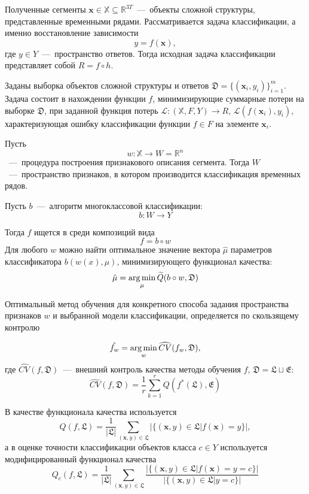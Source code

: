 \documentclass[12pt, twoside]{article}
\begin{document}
Полученные сегменты $\mathbf{x} \in \mathbb{X}\subseteq \mathds{R}^{3T}$~---~объекты сложной структуры, представленные временными рядами. Рассматривается задача классификации, а именно восстановление зависимости $$y=f(\mathbf{x}),$$ где $y\in Y$~---~пространство ответов. Тогда исходная задача классификации представляет собой $R=f\circ h$.

Заданы выборка объектов сложной структуры и ответов $\mathfrak{D}=\{(\mathbf{x}_i,y_i)\}_{i=1}^m$. Задача состоит в нахождении функции $f$, минимизирующие суммарные потери на выборке $\mathfrak{D}$, при заданной функция потерь $\mathscr{L}:(\mathbb{X},F,Y)\rightarrow R$, $\mathscr{L}(f(\mathbf{x}_i),y_i)$, характеризующая ошибку классификации функции $f\in F$ на элементе $\mathbf{x}_i$. 

Пусть $$w:\mathbb{X}\rightarrow W = \mathds{R}^n$$~---~процедура построения признакового описания сегмента. Тогда $W$~---~пространство признаков, в котором производится классификация временных рядов.

Пусть $b$~---~алгоритм многоклассовой классификации: 
\begin{equation}\label{classif}
b:W\rightarrow Y
\end{equation}

Тогда $f$ ищется в среди композиций вида 
$$f=b\circ w$$
Для любого $w$ можно найти оптимальное значение вектора $\hat\mu$ параметров классификатора $b(w(x),\mu)$, минимизирующего функционал качества: 
\begin{equation}\label{func_loss}
\hat\mu=\argmin_\mu \widetilde{Q}(b\circ w,\mathfrak{D})
\end{equation}

Оптимальный метод обучения для конкретного способа задания пространства признаков $w$ и выбранной модели классификации, определяется по скользящему контролю

$$\hat{f_{w}}=\argmin\limits_{w}\widehat{CV}(f_{w},\mathfrak{D}),$$ 
где $\widehat{CV}(f,\mathfrak{D})$~---~внешний контроль качества методы обучения $f$, $\mathfrak{D}=\mathfrak{L}\sqcup\mathfrak{E}$:
 \begin{equation}\label{CV}
\widehat{CV}(f, \mathfrak{D})=\frac{1}{r}\sum\limits_{k=1}^r Q(f^*(\mathfrak{L}),\mathfrak{E})
\end{equation}

В качестве функционала качества используется 
$$Q(f,\mathfrak{L})=\frac{1}{|\mathfrak{L}|}\sum\limits_{(\mathbf{x},y)\in\mathfrak{L}}|\{(\mathbf{x},y)\in\mathfrak{L}|f(\mathbf{x})=y\}|,$$ 
а в оценке точности классификации объектов класса $c\in Y$ используется модифицированный функционал качества 
$$Q_c(f,\mathfrak{L})=\frac{1}{|\mathfrak{L}|}\sum\limits_{(\mathbf{x},y)\in\mathfrak{L}}\frac{|\{(\mathbf{x},y)\in\mathfrak{L}|f(\mathbf{x})=y=c\}|}{|\{(\mathbf{x},y)\in\mathfrak{L}|y=c\}|}$$
\end{document}
